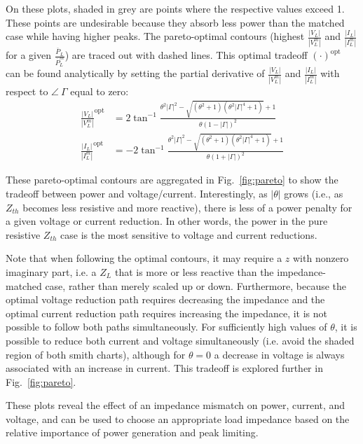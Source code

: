 \documentclass{ifacconf}
\begin{document}
On these plots, shaded in grey are points where the respective values exceed 1. These points are undesirable because they absorb less power than the matched case while having higher peaks. The pareto-optimal contours (highest $\frac{|V_L|}{|V_L^m|}$ and $\frac{|I_L|}{|I_L^m|}$ for a given $\frac{\overline{P}_L}{\overline{P}_L^m}$) are traced out with dashed lines. This optimal tradeoff $(\cdot)^\textrm{opt}$ can be found analytically by setting the partial derivative of $\frac{|V_L|}{|V_L^m|}$ and $\frac{|I_L|}{|I_L^m|}$ with respect to $\angle~\Gamma$ equal to zero:
\begin{equation}\label{eq:optimal-vi}
\begin{aligned}
    \frac{|V_L|}{|V_L^m|}^\textrm{opt} &= 2 \tan^{-1}{ \frac{\theta^2 |\Gamma|^2 - \sqrt{(\theta^2 + 1)(\theta^2 |\Gamma|^4 + 1)} + 1}{\theta (1 - |\Gamma|)^2}} \\
    \frac{|I_L|}{|I_L^m|}^\textrm{opt} &= -2 \tan^{-1}{ \frac{\theta^2 |\Gamma|^2 - \sqrt{(\theta^2 + 1)(\theta^2 |\Gamma|^4 + 1)} + 1}{\theta (1 + |\Gamma|)^2}}
\end{aligned}
\end{equation}

These pareto-optimal contours are aggregated in Fig.~\ref{fig:pareto} to show the tradeoff between power and voltage/current. Interestingly, as $|\theta|$ grows (i.e., as $Z_{th}$ becomes less resistive and more reactive), there is less of a power penalty for a given voltage or current reduction. In other words, the power in the pure resistive $Z_{th}$ case is the most sensitive to voltage and current reductions.

Note that when following the optimal contours, it may require a $z$ with nonzero imaginary part, i.e. a $Z_L$ that is more or less reactive than the impedance-matched case, rather than merely scaled up or down. Furthermore, because the optimal voltage reduction path requires decreasing the impedance and the optimal current reduction path requires increasing the impedance, it is not possible to follow both paths simultaneously. For sufficiently high values of $\theta$, it is possible to reduce both current and voltage simultaneously (i.e. avoid the shaded region of both smith charts), although for $\theta=0$ a decrease in voltage is always associated with an increase in current. This tradeoff is explored further in Fig.~\ref{fig:pareto}.

These plots reveal the effect of an impedance mismatch on power, current, and voltage, and can be used to choose an appropriate load impedance based on the relative importance of power generation and peak limiting. 
\end{document}
